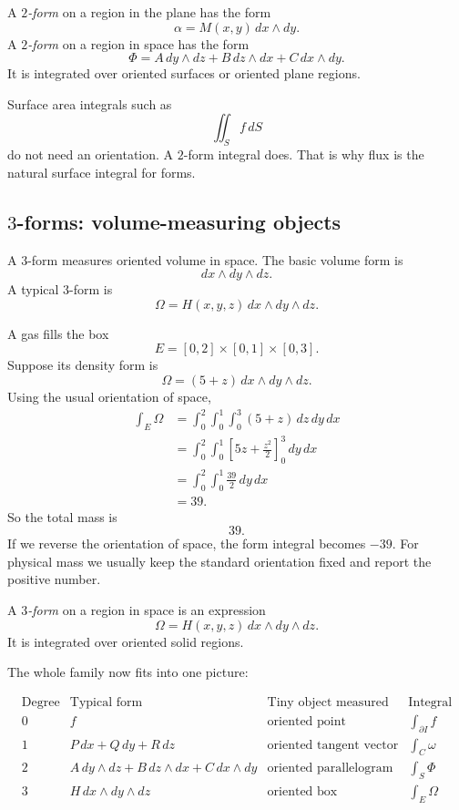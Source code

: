\begin{definition}[\(2\)-form]
A \emph{\(2\)-form} on a region in the plane has the form
\[
    \alpha=M(x,y)\,dx\wedge dy.
\]
A \emph{\(2\)-form} on a region in space has the form
\[
    \Phi=A\,dy\wedge dz+B\,dz\wedge dx+C\,dx\wedge dy.
\]
It is integrated over oriented surfaces or oriented plane regions.
\end{definition}

Surface area integrals such as
\[
    \iint_S f\,dS
\]
do not need an orientation.  A \(2\)-form integral does.  That is why flux is the natural
surface integral for forms.

\subsection{\texorpdfstring{\(3\)}{3}-forms: volume-measuring objects}

A \(3\)-form measures oriented volume in space.  The basic volume form is
\[
    dx\wedge dy\wedge dz.
\]
A typical \(3\)-form is
\[
    \Omega=H(x,y,z)\,dx\wedge dy\wedge dz.
\]

\begin{example}
A gas fills the box
\[
    E=[0,2]\times[0,1]\times[0,3].
\]
Suppose its density form is
\[
    \Omega=(5+z)\,dx\wedge dy\wedge dz.
\]
Using the usual orientation of space,
\[
\begin{aligned}
    \int_E \Omega
    &=
    \int_0^2\int_0^1\int_0^3 (5+z)\,dz\,dy\,dx\\
    &=
    \int_0^2\int_0^1
    \left[5z+\frac{z^2}{2}\right]_0^3
    \,dy\,dx\\
    &=
    \int_0^2\int_0^1
    \frac{39}{2}
    \,dy\,dx\\
    &=
    39.
\end{aligned}
\]
So the total mass is
\[
    39.
\]
If we reverse the orientation of space, the form integral becomes \(-39\).  For physical
mass we usually keep the standard orientation fixed and report the positive number.
\end{example}

\begin{definition}[\(3\)-form]
A \emph{\(3\)-form} on a region in space is an expression
\[
    \Omega=H(x,y,z)\,dx\wedge dy\wedge dz.
\]
It is integrated over oriented solid regions.
\end{definition}

The whole family now fits into one picture:

\[
\begin{array}{c|c|c|c}
\text{Degree} & \text{Typical form} & \text{Tiny object measured} & \text{Integral} \\ \hline
0 & f & \text{oriented point} & \int_{\partial I} f\\[1mm]
1 & P\,dx+Q\,dy+R\,dz & \text{oriented tangent vector} & \int_C \omega\\[1mm]
2 & A\,dy\wedge dz+B\,dz\wedge dx+C\,dx\wedge dy
& \text{oriented parallelogram} & \int_S \Phi\\[1mm]
3 & H\,dx\wedge dy\wedge dz & \text{oriented box} & \int_E \Omega
\end{array}
\]

